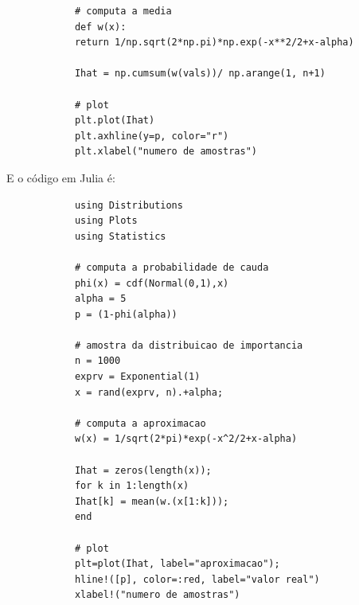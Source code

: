 \begin{exenumerate}
\begin{solution}
\begin{lstlisting}
            # computa a media
            def w(x):
            return 1/np.sqrt(2*np.pi)*np.exp(-x**2/2+x-alpha)
            
            Ihat = np.cumsum(w(vals))/ np.arange(1, n+1)
            
            # plot
            plt.plot(Ihat)
            plt.axhline(y=p, color="r")
            plt.xlabel("numero de amostras")
        \end{lstlisting}
        
        E o c\'odigo em Julia \'e:
        \begin{lstlisting}
            using Distributions
            using Plots
            using Statistics
            
            # computa a probabilidade de cauda
            phi(x) = cdf(Normal(0,1),x)
            alpha = 5
            p = (1-phi(alpha))
            
            # amostra da distribuicao de importancia
            n = 1000
            exprv = Exponential(1)
            x = rand(exprv, n).+alpha;
            
            # computa a aproximacao
            w(x) = 1/sqrt(2*pi)*exp(-x^2/2+x-alpha)
            
            Ihat = zeros(length(x));
            for k in 1:length(x)
            Ihat[k] = mean(w.(x[1:k]));
            end
            
            # plot
            plt=plot(Ihat, label="aproximacao");
            hline!([p], color=:red, label="valor real")
            xlabel!("numero de amostras")
        \end{lstlisting}
        
    \end{solution}
    
\end{exenumerate}


